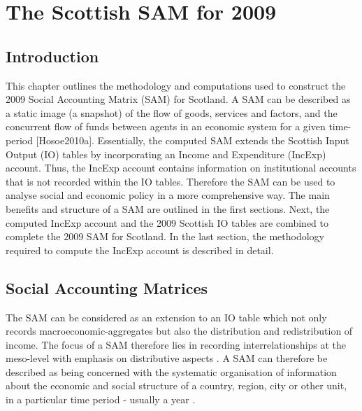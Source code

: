 
\chapter{The Scottish SAM for 2009}
\ifpdf
    \graphicspath{{Chapter1/Chapter1Figs/PNG/}{Chapter1/Chapter1Figs/PDF/}{Chapter1/Chapter1Figs/}}
\else
    \graphicspath{{Chapter1/Chapter1Figs/EPS/}{Chapter1/Chapter1Figs/}}
\fi


\section{Introduction}
\label{sec:2.1}

This chapter outlines the methodology and computations used to construct the 2009 Social Accounting Matrix (SAM) for Scotland. A SAM can be described as a static image (a snapshot) of the flow of goods, services and factors, and the concurrent flow of funds between agents in an economic system for a given time-period [Hosoe2010a]. Essentially, the computed SAM extends the Scottish Input Output (IO) tables by incorporating an Income and Expenditure (IncExp) account. Thus, the IncExp account contains information on institutional accounts that is not recorded within the IO tables. Therefore the SAM can be used to analyse social and economic policy in a more comprehensive way. The main benefits and structure of a SAM are outlined in the first sections.  Next, the computed IncExp account and the 2009 Scottish IO tables are combined to complete the 2009 SAM for Scotland. In the last section, the methodology required to compute the IncExp account is described in detail.

\newpage
\section{Social Accounting Matrices}
\label{sec:2.2}

The SAM can be considered as an extension to an IO table which not only records macroeconomic-aggregates but also the distribution and redistribution of income. The focus of a SAM therefore lies in recording interrelationships at the meso-level with emphasis on distributive aspects \cite{Keuning1988a}. A SAM can therefore be described as being concerned with the systematic organisation of information about the economic and social structure of a country, region, city or other unit, in a particular time period - usually a year \cite{King1981a}.

